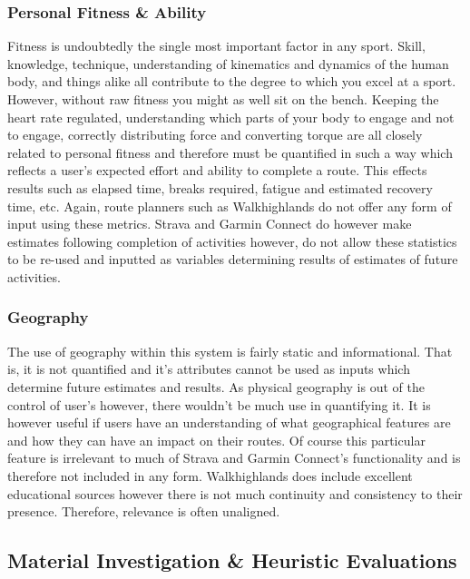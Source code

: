 \documentclass[11pt, english]{article}
\begin{document}
		\subsubsection{Personal Fitness \& Ability}

		Fitness is undoubtedly the single most important factor in any sport. Skill, knowledge, technique, understanding of kinematics and dynamics of the human body, and things alike all contribute to the degree to which you excel at a sport. However, without raw fitness you might as well sit on the bench. Keeping the heart rate regulated, understanding which parts of your body to engage and not to engage, correctly distributing force and converting torque are all closely related to personal fitness and therefore must be quantified in such a way which reflects a user's expected effort and ability to complete a route. This effects results such as elapsed time, breaks required, fatigue and estimated recovery time, etc. Again, route planners such as Walkhighlands do not offer any form of input using these metrics. Strava and Garmin Connect do however make estimates following completion of activities however, do not allow these statistics to be re-used and inputted as variables determining results of estimates of future activities.

		\subsubsection{Geography}

		The use of geography within this system is fairly static and informational. That is, it is not quantified and it's attributes cannot be used as inputs which determine future estimates and results. As physical geography is out of the control of user's however, there wouldn't be much use in quantifying it. It is however useful if users have an understanding of what geographical features are and how they can have an impact on their routes. Of course this particular feature is irrelevant to much of Strava and Garmin Connect's functionality and is therefore not included in any form. Walkhighlands does include excellent educational sources however there is not much continuity and consistency to their presence. Therefore, relevance is often unaligned.

	\subsection{Material Investigation \& Heuristic Evaluations}
\end{document}
